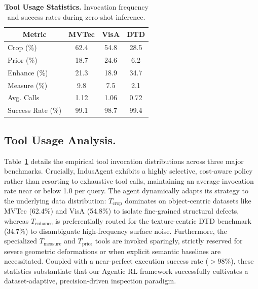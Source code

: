 \documentclass{article}
\begin{document}
{\begin{table}
  \vspace{-1.5em}
  \centering
  \caption{\textbf{Tool Usage Statistics.} Invocation frequency and success rates during zero-shot inference.}
  \label{tab:tool_usage}
  \setlength{\tabcolsep}{4.5pt}
  \footnotesize
  \begin{tabular}{lccc}
    \toprule
    \multicolumn{1}{c}{\textbf{Metric}} & \textbf{MVTec} & \textbf{VisA} & \textbf{DTD} \\
    \midrule
    Crop (\%) & 62.4 & 54.8 & 28.5 \\
    Prior (\%) & 18.7 & 24.6 & 6.2 \\
    Enhance (\%) & 21.3 & 18.9 & 34.7 \\
    Measure (\%) & 9.8 & 7.5 & 2.1 \\
    \midrule
    Avg. Calls & 1.12 & 1.06 & 0.72 \\
    Success Rate (\%) & 99.1 & 98.7 & 99.4 \\
    \bottomrule
  \end{tabular}
  \vspace{-1.0em}
\end{table}

\subsection{Tool Usage Analysis.} Table~\ref{tab:tool_usage} details the empirical tool invocation distributions across three major benchmarks. Crucially, IndusAgent exhibits a highly selective, cost-aware policy rather than resorting to exhaustive tool calls, maintaining an average invocation rate near or below 1.0 per query. The agent dynamically adapts its strategy to the underlying data distribution: $T_{\text{crop}}$ dominates on object-centric datasets like MVTec (62.4\%) and VisA (54.8\%) to isolate fine-grained structural defects, whereas $T_{\text{enhance}}$ is preferentially routed for the texture-centric DTD benchmark (34.7\%) to disambiguate high-frequency surface noise. Furthermore, the specialized $T_{\text{measure}}$ and $T_{\text{prior}}$ tools are invoked sparingly, strictly reserved for severe geometric deformations or when explicit semantic baselines are necessitated. Coupled with a near-perfect execution success rate ($>98\%$), these statistics substantiate that our Agentic RL framework successfully cultivates a dataset-adaptive, precision-driven inspection paradigm.






}
\end{document}

